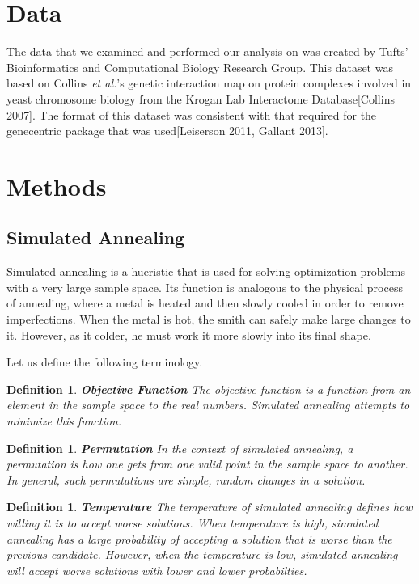 \documentclass[11pt]{article}
\newtheorem{definition}[theorem]{Definition}
\begin{document}
\section{Data}

The data that we examined and performed our analysis on was created by Tufts' Bioinformatics and Computational Biology Research Group. This dataset was based on Collins \textit{et al.}'s genetic interaction map on protein complexes involved in yeast chromosome biology from the Krogan Lab Interactome Database[Collins 2007]. The format of this dataset was consistent with that required for the genecentric package that was used[Leiserson 2011, Gallant 2013]. 
\section{Methods}
\subsection{Simulated Annealing}
\par Simulated annealing is a hueristic that is used for solving optimization problems with a very large sample space. Its function is analogous to the physical process of annealing, where a metal is heated and then slowly cooled in order to remove imperfections. When the metal is hot, the smith can safely make large changes to it. However, as it colder, he must work it more slowly into its final shape. 

\par Let us define the following terminology. 

\begin{definition}
{\bf Objective Function} The objective function is a function from an element in the sample space to the real numbers. Simulated annealing attempts to minimize this function.
\end{definition}
 
\begin{definition}
{\bf Permutation} In the context of simulated annealing, a permutation is how one gets from one valid point in the sample space to another. In general, such permutations are simple, random changes in a solution. 
\end{definition}


\begin{definition}
{\bf Temperature} The temperature of simulated annealing defines how willing it is to accept worse solutions. When temperature is high, simulated annealing has a large probability of accepting a solution that is worse than the previous candidate. However, when the temperature is low, simulated annealing will accept worse solutions with lower and lower probabilties. 
\end{definition}
\end{document}
